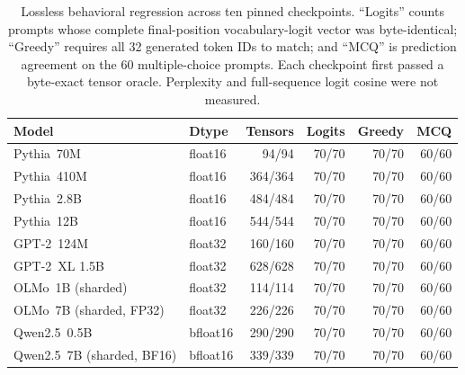 \begin{table}[t]
\centering
\small
\begin{tabular}{llrrrr}
\toprule
Model & Dtype & Tensors & Logits & Greedy & MCQ \\
\midrule
Pythia~70M & float16 & 94/94 & 70/70 & 70/70 & 60/60 \\
Pythia~410M & float16 & 364/364 & 70/70 & 70/70 & 60/60 \\
Pythia~2.8B & float16 & 484/484 & 70/70 & 70/70 & 60/60 \\
Pythia~12B & float16 & 544/544 & 70/70 & 70/70 & 60/60 \\
GPT-2~124M & float32 & 160/160 & 70/70 & 70/70 & 60/60 \\
GPT-2~XL 1.5B & float32 & 628/628 & 70/70 & 70/70 & 60/60 \\
OLMo~1B (sharded) & float32 & 114/114 & 70/70 & 70/70 & 60/60 \\
OLMo~7B (sharded, FP32) & float32 & 226/226 & 70/70 & 70/70 & 60/60 \\
Qwen2.5~0.5B & bfloat16 & 290/290 & 70/70 & 70/70 & 60/60 \\
Qwen2.5~7B (sharded, BF16) & bfloat16 & 339/339 & 70/70 & 70/70 & 60/60 \\
\bottomrule
\end{tabular}
\caption{Lossless behavioral regression across ten pinned checkpoints. ``Logits'' counts prompts whose complete final-position vocabulary-logit vector was byte-identical; ``Greedy'' requires all 32 generated token IDs to match; and ``MCQ'' is prediction agreement on the 60 multiple-choice prompts. Each checkpoint first passed a byte-exact tensor oracle. Perplexity and full-sequence logit cosine were not measured.}
\label{tab:behavioral-matrix}
\end{table}
